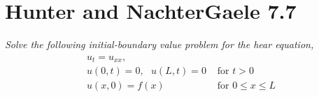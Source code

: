 \documentclass[12pt]{article}
\theoremstyle{plain}
\begin{document}
\section*{Hunter and NachterGaele 7.7}
\emph{Solve the following initial-boundary value problem for the hear equation,}
\begin{align*}
    \begin{array}{ll}
    u_t = u_{xx}, & \\
    u(0, t) = 0,\ \ \ u(L,t) = 0 & \text{ for } t > 0 \\
    u(x, 0) = f(x) & \text{ for } 0 \leq x \leq L
    \end{array}
\end{align*}
\end{document}
